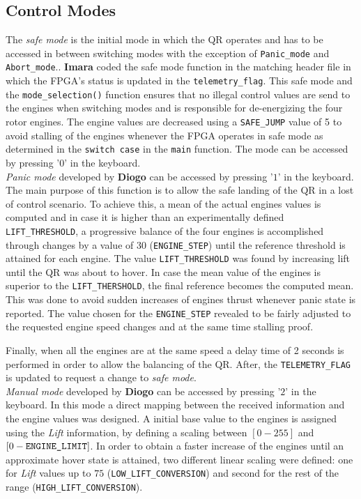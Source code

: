 \documentclass{article}
\begin{document}
\subsection{Control Modes}

\label{sec:safemode}
The \emph{safe mode} is the initial mode in which the QR operates and has to be accessed in between switching modes with the exception of \texttt{Panic\_mode} and \texttt{Abort\_mode}.. \textbf{Imara} coded the safe mode function in the matching header file in which the FPGA's status is updated in the \texttt{telemetry\_flag}. This safe mode and the \texttt{mode\_selection()} function ensures that no illegal control values are send to the engines when switching modes and is responsible for de-energizing the four rotor engines. The engine values are decreased using a \texttt{SAFE\_JUMP} value of 5 to avoid stalling of the engines whenever the FPGA operates in safe mode as determined in the \texttt{switch case} in the \texttt{main} function. The mode can be accessed by pressing '$0$' in the keyboard.\\

\textit{Panic mode} developed by \textbf{Diogo} can be accessed by pressing '$1$' in the keyboard. The main purpose of this function is to allow the safe landing of the QR in a lost of control scenario. To achieve this, a mean of the actual engines values is computed and in case it is higher than an experimentally defined \texttt{LIFT\_THRESHOLD}, a progressive balance of the four engines is accomplished through changes by a value of $30$ (\texttt{ENGINE\_STEP}) until the reference threshold is attained for each engine. The value \texttt{LIFT\_THRESHOLD} was found by increasing lift until the QR was about to hover.  In case the mean value of the engines is superior to the \texttt{LIFT\_THERSHOLD}, the final reference becomes the computed mean. This was done to avoid sudden increases of engines thrust whenever panic state is reported. The value chosen for the \texttt{ENGINE\_STEP} revealed to be fairly adjusted to the requested engine speed changes and at the same time stalling proof.

Finally, when all the engines are at the same speed a delay time of 2 seconds is performed in order to allow the balancing of the QR. After, the \texttt{TELEMETRY\_FLAG} is updated to request a change to \textit{safe mode}.\\

\textit{Manual mode} developed by \textbf{Diogo} can be accessed by pressing '$2$' in the keyboard. In this mode a direct mapping between the received information and the engine values was designed. A initial base value to the engines is assigned using the \textit{Lift} information, by defining a scaling between $[0-255]$ and $[0-\text{\texttt{ENGINE\_LIMIT}}]$. In order to obtain a faster increase of the engines until an approximate hover state is attained, two different linear scaling were defined: one for \textit{Lift} values up to $75$ (\texttt{LOW\_LIFT\_CONVERSION}) and second for the rest of the range (\texttt{HIGH\_LIFT\_CONVERSION}).
\end{document}
